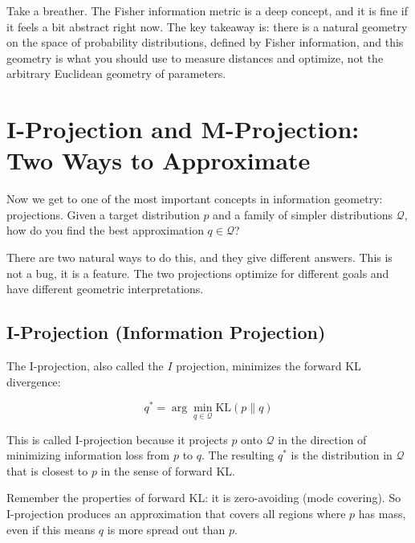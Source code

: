 
\vspace{1.5em}

Take a breather. The Fisher information metric is a deep concept, and it is fine if it feels a bit abstract right now. The key takeaway is: there is a natural geometry on the space of probability distributions, defined by Fisher information, and this geometry is what you should use to measure distances and optimize, not the arbitrary Euclidean geometry of parameters.

\vspace{2em}

\section{I-Projection and M-Projection: Two Ways to Approximate}
\label{sec:projections}

Now we get to one of the most important concepts in information geometry: projections. Given a target distribution $p$ and a family of simpler distributions $\mathcal{Q}$, how do you find the best approximation $q \in \mathcal{Q}$?

There are two natural ways to do this, and they give different answers. This is not a bug, it is a feature. The two projections optimize for different goals and have different geometric interpretations.

\vspace{1.5em}

\subsection{I-Projection (Information Projection)}

The I-projection, also called the $I$ projection, minimizes the forward KL divergence:

\begin{equation}
q^* = \arg\min_{q \in \mathcal{Q}} \text{KL}(p \| q)
\end{equation}

This is called I-projection because it projects $p$ onto $\mathcal{Q}$ in the direction of minimizing information loss from $p$ to $q$. The resulting $q^*$ is the distribution in $\mathcal{Q}$ that is closest to $p$ in the sense of forward KL.

\vspace{1em}

Remember the properties of forward KL: it is zero-avoiding (mode covering). So I-projection produces an approximation that covers all regions where $p$ has mass, even if this means $q$ is more spread out than $p$.

